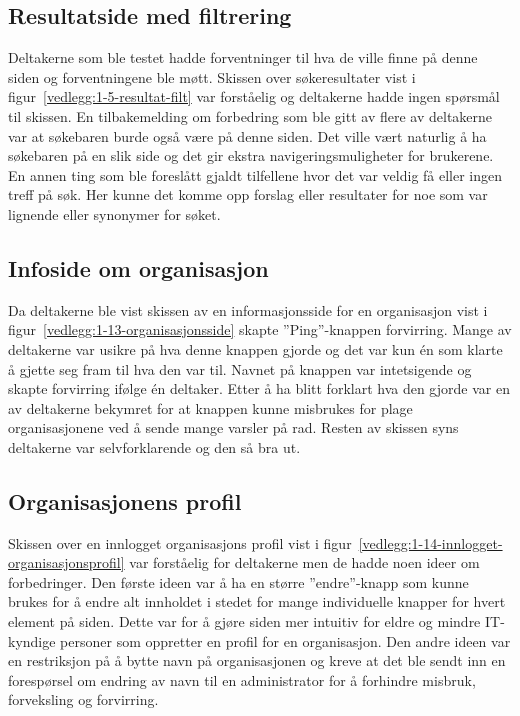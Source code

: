 \subsection{Resultatside med filtrering}

Deltakerne som ble testet hadde forventninger til hva de ville finne på denne siden og forventningene ble møtt. 
Skissen over søkeresultater vist i figur~\ref{vedlegg:1-5-resultat-filt} var forståelig og deltakerne hadde ingen spørsmål til skissen.
En tilbakemelding om forbedring som ble gitt av flere av deltakerne var at søkebaren burde også være på denne siden. Det ville vært naturlig å ha søkebaren på en slik side og det gir ekstra navigeringsmuligheter for brukerene. En annen ting som ble foreslått gjaldt tilfellene hvor det var veldig få eller ingen treff på søk. Her kunne det komme opp forslag eller resultater for noe som var lignende eller synonymer for søket.


\subsection{Infoside om organisasjon}

Da deltakerne ble vist skissen av en informasjonsside for en organisasjon vist i figur~\ref{vedlegg:1-13-organisasjonsside} skapte ''Ping''-knappen forvirring. Mange av deltakerne var usikre på hva denne knappen gjorde og det var kun én som klarte å gjette seg fram til hva den var til. Navnet på knappen var intetsigende og skapte forvirring ifølge én deltaker. Etter å ha blitt forklart hva den gjorde var en av deltakerne bekymret for at knappen kunne misbrukes for plage organisasjonene ved å sende mange varsler på rad. Resten av skissen syns deltakerne var selvforklarende og den så bra ut. 


\subsection{Organisasjonens profil}

Skissen over en innlogget organisasjons profil vist i figur~\ref{vedlegg:1-14-innlogget-organisasjonsprofil} var forståelig for deltakerne men de hadde noen ideer om forbedringer. Den første ideen var å ha en større ''endre''-knapp som kunne brukes for å endre alt innholdet i stedet for mange individuelle knapper for hvert element på siden. Dette var for å gjøre siden mer intuitiv for eldre og mindre IT-kyndige personer som oppretter en profil for en  organisasjon. Den andre ideen var en restriksjon på å bytte navn på organisasjonen og kreve at det ble sendt inn en forespørsel om endring av navn til en administrator for å forhindre misbruk, forveksling og forvirring.

